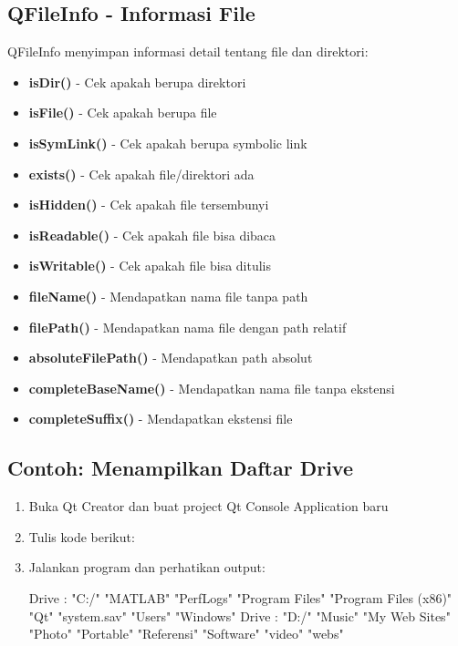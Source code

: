 \subsection{QFileInfo - Informasi File}

QFileInfo menyimpan informasi detail tentang file dan direktori:

\begin{itemize}
\item \textbf{isDir()} - Cek apakah berupa direktori
\item \textbf{isFile()} - Cek apakah berupa file
\item \textbf{isSymLink()} - Cek apakah berupa symbolic link
\item \textbf{exists()} - Cek apakah file/direktori ada
\item \textbf{isHidden()} - Cek apakah file tersembunyi
\item \textbf{isReadable()} - Cek apakah file bisa dibaca
\item \textbf{isWritable()} - Cek apakah file bisa ditulis
\item \textbf{fileName()} - Mendapatkan nama file tanpa path
\item \textbf{filePath()} - Mendapatkan nama file dengan path relatif
\item \textbf{absoluteFilePath()} - Mendapatkan path absolut
\item \textbf{completeBaseName()} - Mendapatkan nama file tanpa ekstensi
\item \textbf{completeSuffix()} - Mendapatkan ekstensi file
\end{itemize}

\subsection{Contoh: Menampilkan Daftar Drive}

\begin{enumerate}
\item Buka Qt Creator dan buat project Qt Console Application baru
\item Tulis kode berikut:



\item Jalankan program dan perhatikan output:

\begin{lcverbatim}
Drive : "C:/"
 "MATLAB"
 "PerfLogs"
 "Program Files"
 "Program Files (x86)"
 "Qt"
 "system.sav"
 "Users"
 "Windows"
Drive : "D:/"
 "Music"
 "My Web Sites"
 "Photo"
 "Portable"
 "Referensi"
 "Software"
 "video"
 "webs"
\end{lcverbatim}
\end{enumerate}

